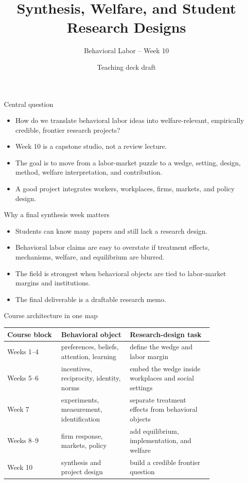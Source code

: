 \documentclass[aspectratio=169,11pt]{beamer}
\title{Synthesis, Welfare, and Student Research Designs}
\subtitle{Behavioral Labor -- Week 10}
\author{Teaching deck draft}
\date{}
\begin{document}
\begin{frame}
  \titlepage
\end{frame}

\begin{frame}{Central question}
\begin{itemize}
    \item How do we translate behavioral labor ideas into welfare-relevant, empirically credible, frontier research projects?
    \item Week 10 is a capstone studio, not a review lecture.
    \item The goal is to move from a labor-market puzzle to a wedge, setting, design, method, welfare interpretation, and contribution.
    \item A good project integrates workers, workplaces, firms, markets, and policy design.
\end{itemize}
\end{frame}

\begin{frame}{Why a final synthesis week matters}
\begin{itemize}
    \item Students can know many papers and still lack a research design.
    \item Behavioral labor claims are easy to overstate if treatment effects, mechanisms, welfare, and equilibrium are blurred.
    \item The field is strongest when behavioral objects are tied to labor-market margins and institutions.
    \item The final deliverable is a draftable research memo.
\end{itemize}
\end{frame}

\begin{frame}{Course architecture in one map}
\small
\begin{tabular}{p{0.22\linewidth} p{0.28\linewidth} p{0.34\linewidth}}
\toprule
Course block & Behavioral object & Research-design task \\
\midrule
Weeks 1--4 & preferences, beliefs, attention, learning & define the wedge and labor margin \\
Weeks 5--6 & incentives, reciprocity, identity, norms & embed the wedge inside workplaces and social settings \\
Week 7 & experiments, measurement, identification & separate treatment effects from behavioral objects \\
Weeks 8--9 & firm response, markets, policy & add equilibrium, implementation, and welfare \\
Week 10 & synthesis and project design & build a credible frontier question \\
\bottomrule
\end{tabular}
\end{frame}
\end{document}

